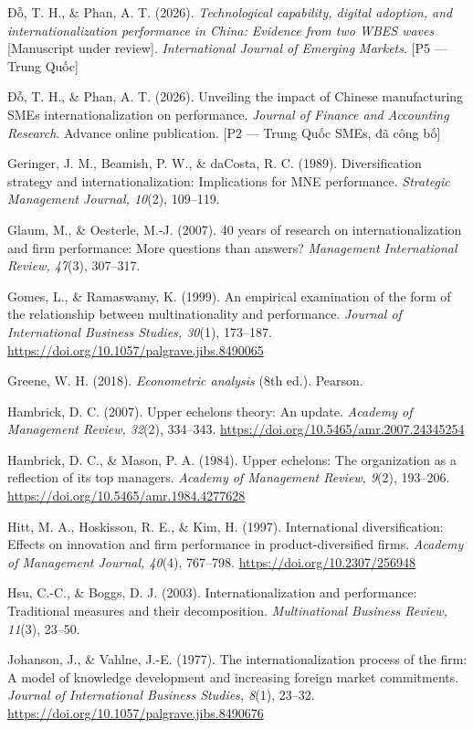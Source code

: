 \documentclass[12pt,a4paper]{article}
\begin{document}
Đỗ, T. H., \& Phan, A. T. (2026). \emph{Technological capability,
digital adoption, and internationalization performance in China:
Evidence from two WBES waves} {[}Manuscript under review{]}.
\emph{International Journal of Emerging Markets}. {[}P5 --- Trung
Quốc{]}

Đỗ, T. H., \& Phan, A. T. (2026). Unveiling the impact of Chinese
manufacturing SMEs\textquotesingle{} internationalization on
performance. \emph{Journal of Finance and Accounting Research}. Advance
online publication. {[}P2 --- Trung Quốc SMEs, đã công bố{]}

Geringer, J. M., Beamish, P. W., \& daCosta, R. C. (1989).
Diversification strategy and internationalization: Implications for MNE
performance. \emph{Strategic Management Journal, 10}(2), 109--119.

Glaum, M., \& Oesterle, M.-J. (2007). 40 years of research on
internationalization and firm performance: More questions than answers?
\emph{Management International Review, 47}(3), 307--317.

Gomes, L., \& Ramaswamy, K. (1999). An empirical examination of the form
of the relationship between multinationality and performance.
\emph{Journal of International Business Studies, 30}(1), 173--187.
\url{https://doi.org/10.1057/palgrave.jibs.8490065}

Greene, W. H. (2018). \emph{Econometric analysis} (8th ed.). Pearson.

Hambrick, D. C. (2007). Upper echelons theory: An update. \emph{Academy
of Management Review, 32}(2), 334--343.
\url{https://doi.org/10.5465/amr.2007.24345254}

Hambrick, D. C., \& Mason, P. A. (1984). Upper echelons: The
organization as a reflection of its top managers. \emph{Academy of
Management Review, 9}(2), 193--206.
\url{https://doi.org/10.5465/amr.1984.4277628}

Hitt, M. A., Hoskisson, R. E., \& Kim, H. (1997). International
diversification: Effects on innovation and firm performance in
product-diversified firms. \emph{Academy of Management Journal, 40}(4),
767--798. \url{https://doi.org/10.2307/256948}

Hsu, C.-C., \& Boggs, D. J. (2003). Internationalization and
performance: Traditional measures and their decomposition.
\emph{Multinational Business Review, 11}(3), 23--50.

Johanson, J., \& Vahlne, J.-E. (1977). The internationalization process
of the firm: A model of knowledge development and increasing foreign
market commitments. \emph{Journal of International Business Studies,
8}(1), 23--32. \url{https://doi.org/10.1057/palgrave.jibs.8490676}
\end{document}

